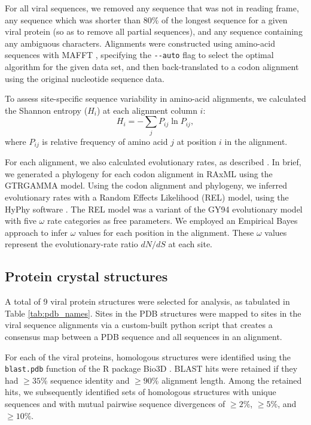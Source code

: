 \documentclass[12pt]{article}
\begin{document}
For all viral sequences, we removed any sequence that was not in reading frame, any sequence which was shorter than 80\% of the longest sequence for a given viral protein (so as to remove all partial sequences), and any sequence containing any ambiguous characters. Alignments were constructed using amino-acid sequences with MAFFT \citep{Katohetal2002,Katohetal2005}, specifying the \verb+--auto+ flag to select the optimal algorithm for the given data set, and then back-translated to a codon alignment using the original nucleotide sequence data.

To assess site-specific sequence variability in amino-acid alignments, we calculated the Shannon entropy ($H_i$) at each alignment column $i$:
\begin{equation}
        H_i = - \sum_jP_{ij}\ln P_{ij},
\end{equation}
where $P_{ij}$ is relative frequency of amino acid $j$ at position $i$ in the alignment.

For each alignment, we also calculated evolutionary rates, as described \citep{SpielmanWilke2013}. In brief, we generated a phylogeny for each codon alignment in RAxML \citep{RaxMLHPC} using the GTRGAMMA model. Using the codon alignment and phylogeny, we inferred evolutionary rates with a Random Effects Likelihood (REL) model, using the HyPhy software \citep{KosakovskyPondetal2005}. The REL model was a variant of the GY94 evolutionary model \citep{GoldmanYang1994} with five $\omega$ rate categories as free parameters.  We employed an Empirical Bayes approach \citep{Yang2000} to infer $\omega$ values for each position in the alignment. These $\omega$ values represent the evolutionary-rate ratio $dN/dS$ at each site.


\subsection*{Protein crystal structures}

A total of 9 viral protein structures were selected for analysis, as tabulated in Table \ref{tab:pdb_names}. Sites in the PDB structures were mapped to sites in the viral sequence alignments via a custom-built python script that creates a consensus map between a PDB sequence and all sequences in an alignment.

For each of the viral proteins, homologous structures were identified using the \texttt{blast.pdb} function of the R package Bio3D \citep{Grantetal2006}. BLAST hits were retained if they had $\geq35$\% sequence identity and $\geq90$\% alignment length. Among the retained hits, we subsequently identified sets of homologous structures with unique sequences and with mutual pairwise sequence divergences of $\geq2\%$, $\geq5\%$, and $\geq10\%$.
\end{document}
